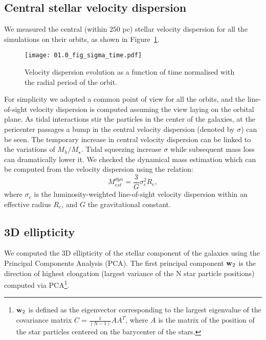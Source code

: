 \subsection{Central stellar velocity dispersion}
We measured the central (within $250$ pc) stellar velocity dispersion for all the simulations on their orbits, as shown in Figure~\ref{fig:sigma}.
\begin{figure}[ht]
\centering
\texttt{[image: 01.0\_fig\_sigma\_time.pdf]}
\caption{Velocity dispersion evolution as a function of time normalised with the radial period of the orbit.
}
\label{fig:sigma}
\end{figure}
For simplicity we adopted a common point of view for all the orbits, and the line-of-sight velocity dispersion is computed assuming the view laying on the orbital plane.
As tidal interactions stir the particles in the center of the galaxies, at the pericenter passages a bump in the central velocity dispersion (denoted by $\sigma$) can be seen.
The temporary increase in central velocity dispersion can be linked to the variations of $M_h/M_\star$.
Tidal squeezing increase $\sigma$ while subsequent mass loss can dramatically lower it.
We checked the dynamical mass estimation which can be computed from the velocity dispersion using the \citet{Wolf2010} relation:
\begin{equation*}
M^{dyn}_{est} = \dfrac{3}{G} \sigma_e^2 R_e, 
\end{equation*}
where $\sigma_e$ is the luminosity-weighted line-of-sight velocity dispersion within an effective radius $R_e$,
and $G$ the gravitational constant.





\subsection{3D ellipticity}
We computed the 3D ellipticity of the stellar component of the galaxies using the Principal Components Analysis (PCA).
The first principal component $\boldsymbol{\mathbf{w}}_2$ is the direction of highest elongation (largest variance of the N star particle positions) computed via PCA\footnote{$\boldsymbol{\mathbf{w}}_2$ is defined as the eigenvector corresponding to the largest eigenvalue of the covariance matrix $C = \frac 1 {(N-1)} AA^T$, where $A$ is the matrix of the position of the star particles centered on the barycenter of the stars.}.

